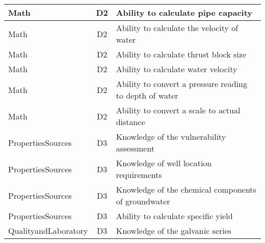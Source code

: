 \documentclass{article}
\begin{document}
\begin{table}[]
\begin{tabular}{|l|c|l|}
Math                                   & D2             & Ability to calculate   pipe capacity                                                                                              \\ \hline
Math                                   & D2             & Ability to calculate   the velocity of water                                                                                      \\ \hline
Math                                   & D2             & Ability to calculate   thrust block size                                                                                          \\ \hline
Math                                   & D2             & Ability to calculate   water velocity                                                                                             \\ \hline
Math                                   & D2             & Ability to convert a   pressure reading to depth of water                                                                         \\ \hline
Math                                   & D2             & Ability to convert a   scale to actual distance                                                                                   \\ \hline
PropertiesSources                      & D3             & Knowledge of the   vulnerability assessment                                                                                       \\ \hline
PropertiesSources                      & D3             & Knowledge of well   location requirements                                                                                         \\ \hline
PropertiesSources                      & D3             & Knowledge of the   chemical components of groundwater                                                                             \\ \hline
PropertiesSources                      & D3             & Ability to calculate   specific yield                                                                                             \\ \hline
QualityandLaboratory                   & D3             & Knowledge of the   galvanic series                                                                                                \\ \hline

\end{tabular}
\end{table}
\end{document}
